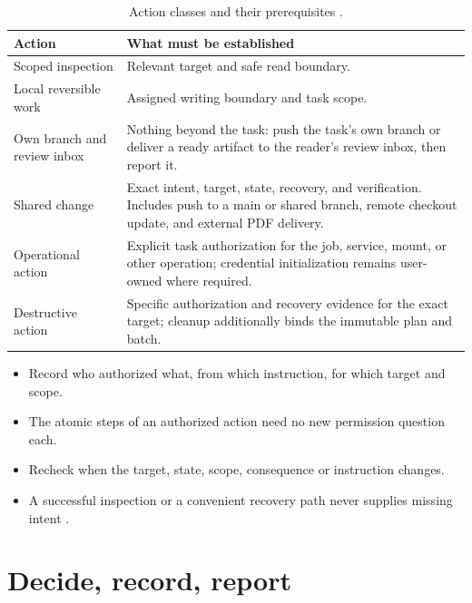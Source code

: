 \begin{table}[H]
  \small
  \begin{tabularx}{\textwidth}{L{0.25\textwidth}Y}
    \toprule
    Action & What must be established \\
    \midrule
    Scoped inspection & Relevant target and safe read boundary. \\
    Local reversible work & Assigned writing boundary and task scope. \\
    Own branch and review inbox & Nothing beyond the task: push the task's own branch or
    deliver a ready artifact to the reader's review inbox, then report it. \\
    Shared change & Exact intent, target, state, recovery, and verification. Includes
    push to a main or shared branch, remote checkout update, and external PDF delivery. \\
    Operational action & Explicit task authorization for the job, service, mount,
    or other operation; credential initialization remains user-owned where required. \\
    Destructive action & Specific authorization and recovery evidence for the exact
    target; cleanup additionally binds the immutable plan and batch. \\
    \bottomrule
  \end{tabularx}
  \caption{Action classes and their prerequisites
    \cite[Preflight]{skill:actions}.}
  \label{tab:consequence}
\end{table}

\begin{itemize}
  \item Record who authorized what, from which instruction, for which target and scope.
  \item The atomic steps of an authorized action need no new permission question each.
  \item Recheck when the target, state, scope, consequence or instruction changes.
  \item A successful inspection or a convenient recovery path never supplies missing intent
        \cite[Preflight]{skill:actions}.
\end{itemize}

\section{Decide, record, report}

